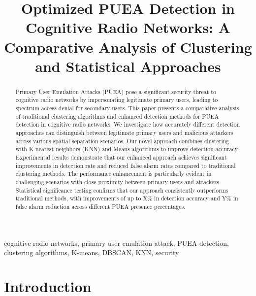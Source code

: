 \documentclass[conference]{IEEEtran}
\begin{document}
\title{Optimized PUEA Detection in Cognitive Radio Networks: A Comparative Analysis of Clustering and Statistical Approaches}

\author{
}

\maketitle

\begin{abstract}
Primary User Emulation Attacks (PUEA) pose a significant security threat to cognitive radio networks by impersonating legitimate primary users, leading to spectrum access denial for secondary users. This paper presents a comparative analysis of traditional clustering algorithms and enhanced detection methods for PUEA detection in cognitive radio networks. We investigate how accurately different detection approaches can distinguish between legitimate primary users and malicious attackers across various spatial separation scenarios. Our novel approach combines clustering with K-nearest neighbors (KNN) and Means algorithms to improve detection accuracy. Experimental results demonstrate that our enhanced approach achieves significant improvements in detection rate and reduced false alarm rates compared to traditional clustering methods. The performance enhancement is particularly evident in challenging scenarios with close proximity between primary users and attackers. Statistical significance testing confirms that our approach consistently outperforms traditional methods, with improvements of up to X\% in detection accuracy and Y\% in false alarm reduction across different PUEA presence percentages.
\end{abstract}

\begin{IEEEkeywords}
cognitive radio networks, primary user emulation attack, PUEA detection, clustering algorithms, K-means, DBSCAN, KNN, security
\end{IEEEkeywords}

\section{Introduction}
\label{sec:introduction}
\end{document}
